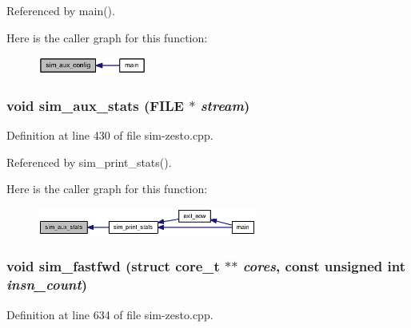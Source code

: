 Referenced by main().

Here is the caller graph for this function:\nopagebreak
\begin{figure}[H]
\begin{center}
\leavevmode
\includegraphics[width=101pt]{sim-zesto_8cpp_67e5d7a21600d2eb1fb2f0798fc24a7c_icgraph}
\end{center}
\end{figure}
\subsubsection[{sim\_\-aux\_\-stats}]{\setlength{\rightskip}{0pt plus 5cm}void sim\_\-aux\_\-stats (FILE $\ast$ {\em stream})}\label{sim-zesto_8cpp_f0d3b44eaaad1fd53b38c9f82deb05fd}




Definition at line 430 of file sim-zesto.cpp.

Referenced by sim\_\-print\_\-stats().

Here is the caller graph for this function:\nopagebreak
\begin{figure}[H]
\begin{center}
\leavevmode
\includegraphics[width=204pt]{sim-zesto_8cpp_f0d3b44eaaad1fd53b38c9f82deb05fd_icgraph}
\end{center}
\end{figure}
\subsubsection[{sim\_\-fastfwd}]{\setlength{\rightskip}{0pt plus 5cm}void sim\_\-fastfwd (struct {\bf core\_\-t} $\ast$$\ast$ {\em cores}, \/  const unsigned int {\em insn\_\-count})}\label{sim-zesto_8cpp_d4465337904f2c1d2b694eb41043de6e}




Definition at line 634 of file sim-zesto.cpp.

